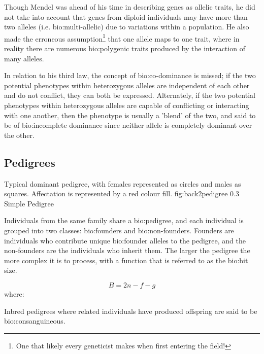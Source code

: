 Though Mendel was ahead of his time in describing genes as allelic traits, he did not take into account that genes from diploid individuals may have more than two alleles (i.e. \gls{bio:multi-allelic}) due to variations within a population.  He also made the erroneous assumption\footnote{One that likely every geneticist makes when first entering the field!} that one allele maps to one trait, where in reality there are numerous \gls{bio:polygenic traits} produced by the interaction of many alleles. 

In relation to his third law, the concept of \gls{bio:co-dominance} is missed; if the two potential phenotypes within heterozygous alleles are independent of each other and do not conflict, they can both be expressed. Alternately, if the two potential phenotypes within heterozygous alleles are capable of conflicting or interacting with one another, then the phenotype is usually a 'blend' of the two, and said to be of \gls{bio:incomplete dominance} since neither allele is completely dominant over the other.


\subsection{Pedigrees}

	{Typical dominant pedigree, with females represented as circles and males as squares. Affectation is represented by a red colour fill.}
	{fig:back2pedigree}
	{0.3}
	{Simple Pedigree}

Individuals from the same family share a \gls{bio:pedigree}, and each individual is grouped into two classes: \gls{bio:founders} and \gls{bio:non-founders}. 
Founders are individuals who contribute unique \gls{bio:founder alleles} to the pedigree, and the non-founders are the individuals who inherit them.
The larger the pedigree the more complex it is to process, with a function that is referred to as the \gls{bio:bit size}.

\begin{equation}
\label{eqn:bitsize}
B = 2n -f -g
\end{equation}
where:

\begin{description}
\end{description}

Inbred pedigrees where related individuals have produced offspring are said to be \gls{bio:consanguineous}.



